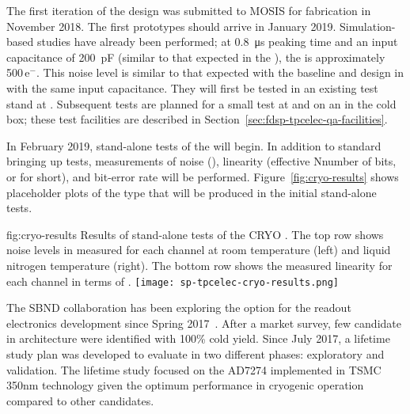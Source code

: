 The first iteration of the   design was submitted to MOSIS  for fabrication in November 2018.  The first prototypes should arrive in January 2019. Simulation-based studies have already been performed; at \SI{0.8}{\micro\second} peaking time and an input capacitance of \SI{200}{pF} (similar to that expected in the  ), the  is approximately \num{500}\,e$^-$.  This noise level is similar to that expected with the baseline  and   design in  with the same input capacitance.  They will first be tested in an existing test stand at .  Subsequent tests are planned for a small test  at  and on an  in the  cold box; these test facilities are described in Section~\ref{sec:fdsp-tpcelec-qa-facilities}.

In February 2019, stand-alone tests of the   will begin. In addition to standard bringing up tests, measurements of noise (), linearity (effective Nnumber of bits, or  for short), and bit-error rate will be performed. Figure~\ref{fig:cryo-results} shows placeholder plots of the type that will be produced in the initial stand-alone tests.

\begin{dunefigure}
{fig:cryo-results}
{Results of stand-alone tests of the CRYO .  The top row shows noise levels in  measured for each channel at room temperature (left) and liquid nitrogen temperature (right).  The bottom row shows the measured linearity for each channel in terms of . }
\texttt{[image: sp-tpcelec-cryo-results.png]}
\end{dunefigure}

\label{sec:fdsp-tpcelec-design-femb-alt-cots}

The SBND collaboration has been exploring the   option for the  readout electronics development since Spring 2017~\cite{Chen:2018zic}. After a market survey, few candidate  in  architecture were identified with 100\% cold yield. Since July 2017, a lifetime study plan was developed to evaluate   in two different phases: exploratory and validation. The lifetime study focused on the %
 AD7274 implemented in TSMC 350nm  technology given the optimum performance in cryogenic operation compared to other candidates.

